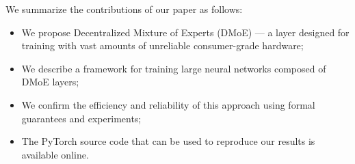 We summarize the contributions of our paper as follows:

\vspace{-6px}
\begin{minipage}{0.55\textwidth}

\begin{itemize}[leftmargin=*]
    \item We propose Decentralized Mixture of Experts (DMoE) --- a layer designed for training with vast amounts of unreliable consumer-grade hardware;%
    \vspace{1px}\item We describe a framework for training large neural networks composed of DMoE layers;%
    \vspace{1px}\item We confirm the efficiency and reliability of this approach using formal guarantees and experiments;
    \vspace{1px}\item The PyTorch source code that can be used to reproduce our results is available online\footnotemark.
\end{itemize}
\end{minipage}
\hspace{5px}
\begin{minipage}{0.45\textwidth}
\vspace{-6px}
    \centering
    \label{fig:teaser}
\end{minipage}

